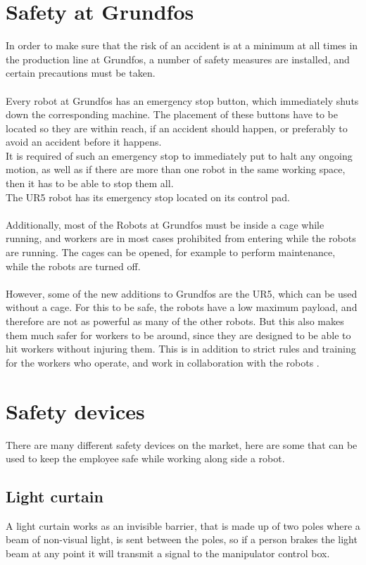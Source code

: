 \section{Safety at Grundfos}\label{ch:Safety at Grundfos}
In order to make sure that the risk of an accident is at a minimum at all times in the production line at Grundfos, a number of safety measures are installed, and certain precautions must be taken.\\
\\
Every robot at Grundfos has an emergency stop button, which immediately shuts down the corresponding machine. The placement of these buttons have to be located so they are within reach, if an accident should happen, or preferably to avoid an accident before it happens. \\
It is required of such an emergency stop to immediately put to halt any ongoing motion, as well as if there are more than one robot in the same working space, then it has to be able to stop them all.\\
The UR5 robot has its emergency stop located on its control pad.\\
\\
Additionally, most of the Robots at Grundfos must be inside a cage while running, and workers are in most cases prohibited from entering while the robots are running. The cages can be opened, for example to perform maintenance, while the robots are turned off.\\
\\
However, some of the new additions to Grundfos are the UR5, which can be used without a cage. For this to be safe, the robots have a low maximum payload, and therefore are not as powerful as many of the other robots. But this also makes them much safer for workers to be around, since they are designed to be able to hit workers without injuring them. This is in addition to strict rules and training for the workers who operate, and work in collaboration with the robots \cite{SafetyatGrundfos}. \\


\section{Safety devices}\label{SafetyDevices}
There are many different safety devices  on the market, here are some that can be used to keep the employee safe while working along side a robot.\\

\subsection{Light curtain}
A light curtain works as an invisible barrier, that is made up of two poles where a beam of non-visual light, is sent between the poles, so if a person brakes the light beam at any point it will transmit a signal to the manipulator control box\cite{ligthcurtian}.\\

